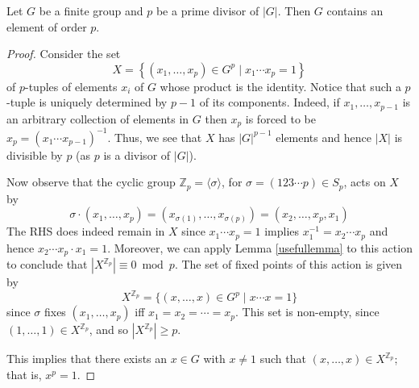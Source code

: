 \begin{theorem}
  Let $G$ be a finite group and $p$ be a prime divisor of $|G|$. Then $G$ contains an element of order $p.$
  \label{thm:cauchy}
\end{theorem}
\begin{proof}
    Consider the set
    $$
    X=\left\{\left(x_1, \ldots, x_p\right) \in G^p \mid x_1 \cdots x_p=1\right\}
    $$
    of $p$-tuples of elements $x_i$ of $G$ whose product is the identity. Notice that such a $p$-tuple is uniquely determined by $p-1$ of its components. Indeed, if $x_1, \ldots, x_{p-1}$ is an arbitrary collection of elements in $G$ then $x_p$ is forced to be $x_p=\left(x_1 \cdots x_{p-1}\right)^{-1}$. Thus, we see that $X$ has $|G|^{p-1}$ elements and hence $|X|$ is divisible by $p$ (as $p$ is a divisor of $|G|$).
    
    Now observe that the cyclic group $\mathbb{Z}_p=\langle\sigma\rangle$, for $\sigma=(123 \cdots p) \in S_p$, acts on $X$ by
    $$
    \sigma \cdot\left(x_1, \ldots, x_p\right)=\left(x_{\sigma(1)}, \ldots, x_{\sigma(p)}\right)=\left(x_2, \ldots, x_p, x_1\right)
    $$
    The RHS does indeed remain in $X$
    since $x_1 \cdots x_p=1$ implies $x_1^{-1}=x_2 \cdots x_p$ and hence $x_2 \cdots x_p \cdot x_1=1$. Moreover, we can apply Lemma \ref{usefullemma} to this action to conclude that $\left|X^{\mathbb{Z}_p}\right| \equiv 0 \bmod p$. 
    The set of fixed points of this action is given by
    $$
    X^{\mathbb{Z}_p} = \{(x, \ldots, x) \in G^p \mid x\cdots x = 1\}
    $$
    since $\sigma$ fixes $\left(x_1, \ldots, x_p\right)$ iff $x_1=x_2=\cdots=x_p$. This set is non-empty, since $(1, \ldots, 1) \in X^{\mathbb{Z}_p}$, and so $\left|X^{\mathbb{Z}_p}\right| \geq p$. 

    This implies that there exists an $x \in G$ with $x \neq 1$ such that $(x, \ldots, x) \in X^{\mathbb{Z}_p}$; that is, $x^p=1$.
\end{proof}

